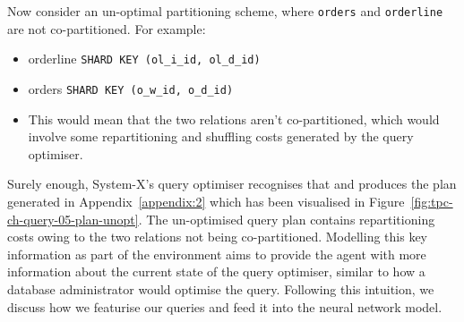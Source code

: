 Now consider an un-optimal partitioning scheme, where \texttt{orders} and \texttt{orderline} are not co-partitioned. For example:
    \begin{itemize}
        \item orderline \texttt{SHARD KEY (ol\_i\_id, ol\_d\_id)}
        \item orders \texttt{SHARD KEY (o\_w\_id, o\_d\_id)}
        \item This would mean that the two relations aren't co-partitioned, which would involve some repartitioning and shuffling costs generated by the query optimiser.
    \end{itemize}
Surely enough, System-X's query optimiser recognises that and produces the plan generated in Appendix~\ref{appendix:2} which has been visualised in Figure~\ref{fig:tpc-ch-query-05-plan-unopt}. The un-optimised query plan contains repartitioning costs owing to the two relations not being co-partitioned. Modelling this key information as part of the environment aims to provide the agent with more information about the current state of the query optimiser, similar to how a database administrator would optimise the query. Following this intuition, we discuss how we featurise our queries and feed it into the neural network model.


